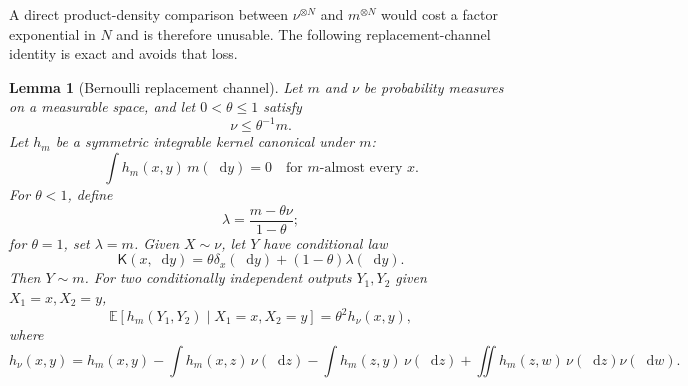 \documentclass[11pt,reqno]{amsart}
\numberwithin{equation}{section}
\theoremstyle{plain}
\newtheorem{lemma}[lemma]{Lemma}
\theoremstyle{definition}
\newcommand{\dd}{\mathop{}\!\mathrm d}
\newcommand{\E}{\mathbb E}
\begin{document}
A direct product-density comparison between $\nu^{\otimes N}$ and $m^{\otimes N}$ would cost a factor exponential in $N$ and is therefore unusable.  The following replacement-channel identity is exact and avoids that loss.

\begin{lemma}[Bernoulli replacement channel]\label{pcsp:lem:replacement-channel}
Let $m$ and $\nu$ be probability measures on a measurable space, and let $0<\theta\leq1$ satisfy
\begin{equation}\label{pcsp:eq:domination}
 \nu\leq\theta^{-1}m.
\end{equation}
Let $h_m$ be a symmetric integrable kernel canonical under $m$:
\begin{equation}\label{pcsp:eq:hm-canonical}
 \int h_m(x,y)\,m(\dd y)=0
 \quad\text{for $m$-almost every $x$}.
\end{equation}
For $\theta<1$, define
\begin{equation}\label{pcsp:eq:lambda}
 \lambda=\frac{m-\theta\nu}{1-\theta};
\end{equation}
for $\theta=1$, set $\lambda=m$.  Given $X\sim\nu$, let $Y$ have conditional law
\begin{equation}\label{pcsp:eq:channel}
 \mathsf K(x,\dd y)=\theta\delta_x(\dd y)+(1-\theta)\lambda(\dd y).
\end{equation}
Then $Y\sim m$.  For two conditionally independent outputs $Y_1,Y_2$ given $X_1=x,X_2=y$,
\begin{equation}\label{pcsp:eq:conditional-kernel-identity}
 \E[h_m(Y_1,Y_2)\mid X_1=x,X_2=y]
 =\theta^2h_\nu(x,y),
\end{equation}
where
\begin{equation}\label{pcsp:eq:hnu-double-centered}
 h_\nu(x,y)
 =h_m(x,y)-\int h_m(x,z)\,\nu(\dd z)
 -\int h_m(z,y)\,\nu(\dd z)
 +\iint h_m(z,w)\,\nu(\dd z)\nu(\dd w).
\end{equation}
\end{lemma}
\end{document}
